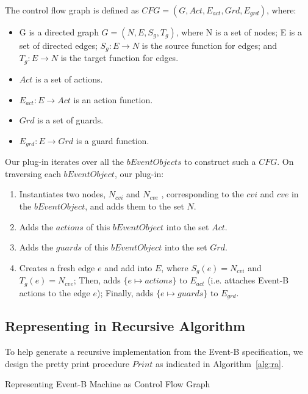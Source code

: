 \documentclass{easychair}
\def\ForEach{\ForAll}
\begin{document}
The control flow graph is defined as $CFG = (G, Act, E_{act}, Grd, E_{grd})$, where:
\begin{itemize}
	\item G is a directed graph $G = (N, E, S_g, T_g)$, where N is a set of nodes; E is a set of directed edges; $S_g : E \rightarrow N $ is the source function for edges; and $T_g : E \rightarrow N$ is the target function for edges.
	\item $Act$ is a set of actions.
	\item $E_{act} : E \rightarrow Act$ is an action function. 
	\item $Grd$ is a set of guards.
	\item $E_{grd} : E \rightarrow Grd$ is a guard function.
\end{itemize}

Our plug-in iterates over all the $bEventObjects$ to construct such a $CFG$. On traversing each $bEventObject$, our plug-in:
\begin{enumerate}
	\item Instantiates two nodes, $N_{cvi}$ and $N_{cve}$ , corresponding to the $cvi$ and $cve$ in the $bEventObject$, and adds them to the set $N$.
	\item Adds the $actions$ of this $bEventObject$ into the set $Act$.
	\item Adds the $guards$ of this $bEventObject$ into the set $Grd$.
	\item Creates a fresh edge $e$ and add into $E$, where $S_g(e) = N_{cvi}$ and $T_g(e) = N_{cve}$; Then, adds $\{e \mapsto actions\}$ to $E_{act}$ (i.e. attaches Event-B actions to the edge $e$); Finally, adds $\{e \mapsto guards\}$ to $E_{grd}$.
\end{enumerate}

\subsection{Representing in Recursive Algorithm}\label{subsect:ra}
To help generate a recursive implementation from the Event-B specification, we design the pretty print procedure $Print$ as indicated in Algorithm~\ref{alg:ra}.

\begin{algorithm}
  \caption{Representing Event-B Machine as Control Flow Graph
    \label{alg:ra}}
  \begin{algorithmic}[1]
    \Statex
        \State {}
        \State {}
      \ForEach{$bEventObject$ $e \in o.nextEvts $}
        \State
      \EndFor
    \EndFunction
  \end{algorithmic}
\end{algorithm}
\end{document}
